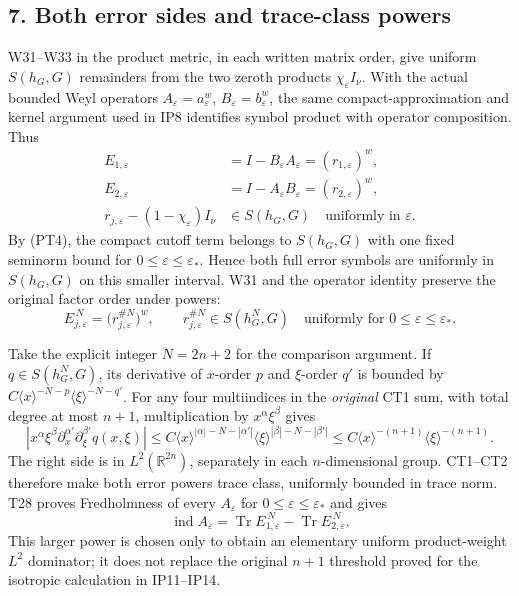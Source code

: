 \documentclass[
  11pt,
]{article}
\begin{document}
\subsection{7. Both error sides and trace-class
powers}\label{both-error-sides-and-trace-class-powers}

W31--W33 in the product metric, in each written matrix order, give
uniform \(S(h_G,G)\) remainders from the two zeroth products
\(\chi_\varepsilon I_\nu\). With the actual bounded Weyl operators
\(A_\varepsilon=a_\varepsilon^w\), \(B_\varepsilon=b_\varepsilon^w\),
the same compact-approximation and kernel argument used in IP8
identifies symbol product with operator composition. Thus \[
 \begin{aligned}
 E_{1,\varepsilon}
 &=I-B_\varepsilon A_\varepsilon
       =(r_{1,\varepsilon})^w,\\
 E_{2,\varepsilon}
 &=I-A_\varepsilon B_\varepsilon
       =(r_{2,\varepsilon})^w,\\
 r_{j,\varepsilon}-(1-\chi_\varepsilon)I_\nu
 &\in S(h_G,G)\quad\text{uniformly in }\varepsilon .
 \end{aligned}
 \tag{PT5}
\] By (PT4), the compact cutoff term belongs to \(S(h_G,G)\) with one
fixed seminorm bound for \(0\le\varepsilon\le\varepsilon_*\). Hence both
full error symbols are uniformly in \(S(h_G,G)\) on this smaller
interval. W31 and the operator identity preserve the original factor
order under powers: \[
 E_{j,\varepsilon}^{\,N}
       =\bigl(r_{j,\varepsilon}^{\#N}\bigr)^w,
 \qquad
 r_{j,\varepsilon}^{\#N}
       \in S(h_G^N,G)
 \quad\text{uniformly for }0\le\varepsilon\le\varepsilon_* .
 \tag{PT6}
\]

Take the explicit integer \(N=2n+2\) for the comparison argument. If
\(q\in S(h_G^N,G)\), its derivative of \(x\)-order \(p\) and
\(\xi\)-order \(q'\) is bounded by
\(C\langle x\rangle^{-N-p}\langle\xi\rangle^{-N-q'}\). For any four
multiindices in the \emph{original} CT1 sum, with total degree at most
\(n+1\), multiplication by \(x^\alpha\xi^\beta\) gives \[
 |x^\alpha\xi^\beta
       \partial_x^{\alpha'}\partial_\xi^{\beta'}q(x,\xi)|
 \le C\langle x\rangle^{|\alpha|-N-|\alpha'|}
       \langle\xi\rangle^{|\beta|-N-|\beta'|}
 \le C\langle x\rangle^{-(n+1)}
       \langle\xi\rangle^{-(n+1)}.
 \tag{PT7}
\] The right side is in \(L^2(\mathbb R^{2n})\), separately in each
\(n\)-dimensional group. CT1--CT2 therefore make both error powers trace
class, uniformly bounded in trace norm. T28 proves Fredholmness of every
\(A_\varepsilon\) for \(0\le\varepsilon\le\varepsilon_*\) and gives \[
 \operatorname{ind}A_\varepsilon
  =\operatorname{Tr}E_{1,\varepsilon}^{\,N}
   -\operatorname{Tr}E_{2,\varepsilon}^{\,N}.
 \tag{PT8}
\] This larger power is chosen only to obtain an elementary uniform
product-weight \(L^2\) dominator; it does not replace the original
\(n+1\) threshold proved for the isotropic calculation in IP11--IP14.
\end{document}
